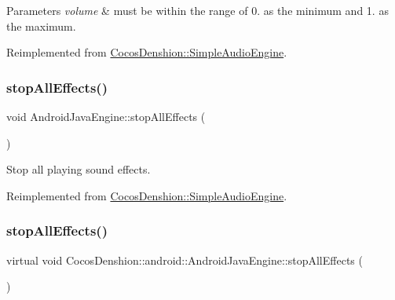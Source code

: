\begin{DoxyParams}{Parameters}
{\em volume} & must be within the range of 0. as the minimum and 1. as the maximum. \\
\hline
\end{DoxyParams}


Reimplemented from \hyperlink{classCocosDenshion_1_1SimpleAudioEngine_a792bcbbf7da23ef90e38aaee576914e7}{Cocos\+Denshion\+::\+Simple\+Audio\+Engine}.

\mbox{\label{classCocosDenshion_1_1android_1_1AndroidJavaEngine_a38d6736750cc2832b9a5dea632f293b6}} 
\subsubsection{\texorpdfstring{stop\+All\+Effects()}{stopAllEffects()}\hspace{0.1cm}{\footnotesize\ttfamily [1/2]}}
{\footnotesize\ttfamily void Android\+Java\+Engine\+::stop\+All\+Effects (\begin{DoxyParamCaption}{ }\end{DoxyParamCaption})\hspace{0.3cm}{\ttfamily [virtual]}}

Stop all playing sound effects. 

Reimplemented from \hyperlink{classCocosDenshion_1_1SimpleAudioEngine_a41cac6b6201c29a06ce18e52191520de}{Cocos\+Denshion\+::\+Simple\+Audio\+Engine}.

\mbox{\label{classCocosDenshion_1_1android_1_1AndroidJavaEngine_a799f2f5d4f50aacfd975e5983f46bbed}} 
\subsubsection{\texorpdfstring{stop\+All\+Effects()}{stopAllEffects()}\hspace{0.1cm}{\footnotesize\ttfamily [2/2]}}
{\footnotesize\ttfamily virtual void Cocos\+Denshion\+::android\+::\+Android\+Java\+Engine\+::stop\+All\+Effects (\begin{DoxyParamCaption}{ }\end{DoxyParamCaption})\hspace{0.3cm}{\ttfamily [virtual]}}

